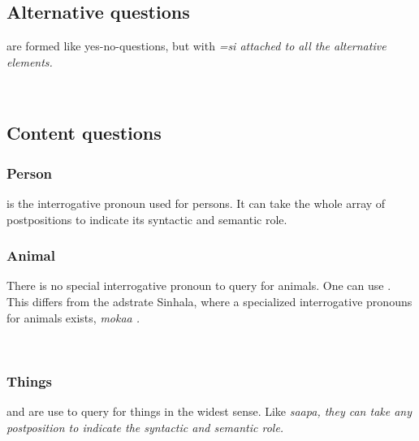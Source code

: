 \subsection{Alternative questions}\label{sec:func:Alternativequestions}
are formed like yes-no-questions, but with \em =si \em attached to all the alternative elements.


\\



\subsection{Content questions}\label{sec:func:Contentquestions}
\subsubsection{Person}\label{sec:func:q:Person}

 is the interrogative pronoun used for persons. It can take the whole array of postpositions to indicate its syntactic and semantic role.


\subsubsection{Animal}\label{sec:func:q:Animal}
There is no special interrogative pronoun to query for animals. One can use . This differs from the adstrate Sinhala, where a specialized interrogative pronouns for animals exists, \em mokaa \em \citep[259]{Karunatillake2004}.


 \\

\subsubsection{Things}\label{sec:func:q:Things}
 and  are use to query for things in the widest sense.   Like \em saapa\em, they can take any postposition to indicate the syntactic and semantic role.

